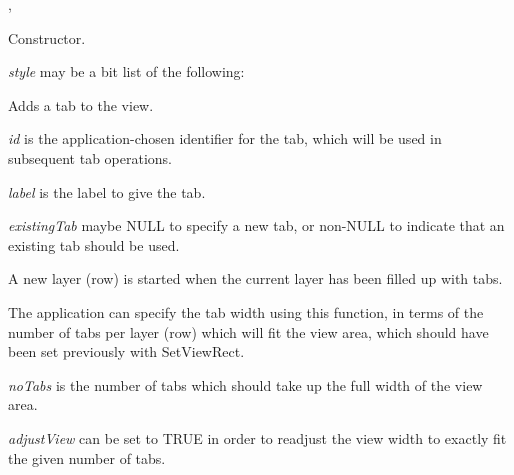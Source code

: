 
, 




Constructor.

{\it style} may be a bit list of the following:

\begin{twocollist}\itemsep=0pt
\end{twocollist}

\label{wxtabviewaddtab}


Adds a tab to the view.

{\it id} is the application-chosen identifier for the tab, which will be used in subsequent tab operations.

{\it label} is the label to give the tab.

{\it existingTab} maybe NULL to specify a new tab, or non-NULL to indicate that an existing tab should be used.

A new layer (row) is started when the current layer has been filled up with tabs.

\label{wxtabviewcalculatetabwidth}


The application can specify the tab width using this function, in terms
of the number of tabs per layer (row) which will fit the view area, which
should have been set previously with SetViewRect.

{\it noTabs} is the number of tabs which should take up the full width
of the view area.

{\it adjustView} can be set to TRUE in order to readjust the view width
to exactly fit the given number of tabs. 

